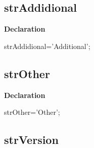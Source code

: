 \documentclass{report}
\newif\ifpdf
\begin{document}
\subsection*{strAddidional}
\fi
\label{trstrings-strAddidional}
\begin{list}{}{
\setlength{\itemindent}{0cm}
\setlength{\listparindent}{0cm}
\setlength{\leftmargin}{\evensidemargin}
\addtolength{\leftmargin}{\tmplength}
\settowidth{\labelsep}{X}
\addtolength{\leftmargin}{\labelsep}
\setlength{\labelwidth}{\tmplength}
}
\item[\textbf{Declaration}\hfill]
\ifpdf
\begin{flushleft}
\fi
\begin{ttfamily}
strAddidional='Additional';\end{ttfamily}

\ifpdf
\end{flushleft}
\fi

\end{list}
\ifpdf
\subsection*{\large{\textbf{strOther}}\normalsize\hspace{1ex}\hrulefill}
\else
\subsection*{strOther}
\fi
\label{trstrings-strOther}
\begin{list}{}{
\setlength{\itemindent}{0cm}
\setlength{\listparindent}{0cm}
\setlength{\leftmargin}{\evensidemargin}
\addtolength{\leftmargin}{\tmplength}
\settowidth{\labelsep}{X}
\addtolength{\leftmargin}{\labelsep}
\setlength{\labelwidth}{\tmplength}
}
\item[\textbf{Declaration}\hfill]
\ifpdf
\begin{flushleft}
\fi
\begin{ttfamily}
strOther='Other';\end{ttfamily}

\ifpdf
\end{flushleft}
\fi

\end{list}
\ifpdf
\subsection*{\large{\textbf{strVersion}}\normalsize\hspace{1ex}\hrulefill}
\else
\end{document}
